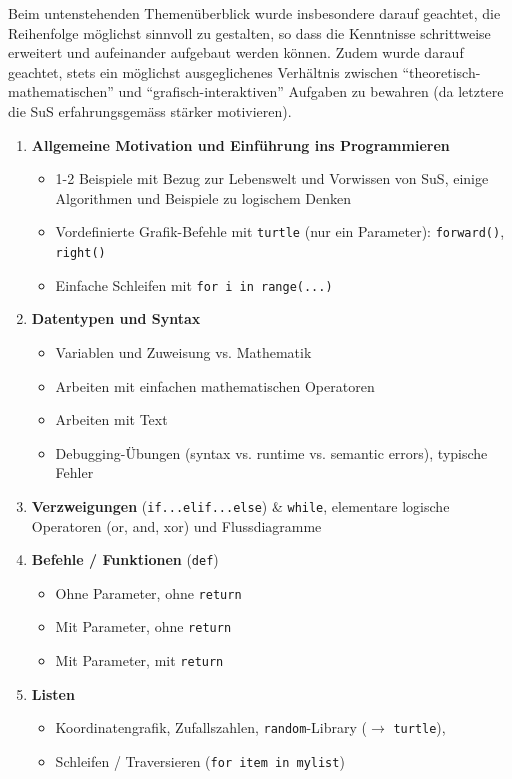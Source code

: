 Beim untenstehenden Themenüberblick wurde insbesondere darauf geachtet, die Reihenfolge möglichst sinnvoll zu gestalten, so dass die Kenntnisse schrittweise erweitert und aufeinander aufgebaut werden können. Zudem wurde darauf geachtet, stets ein möglichst ausgeglichenes Verhältnis zwischen \enquote{theoretisch-mathematischen} und \enquote{grafisch-interaktiven} Aufgaben zu bewahren (da letztere die SuS erfahrungsgemäss stärker motivieren).

\begin{overviewBox}[title=Überblick der Themen]
    \begin{enumerate}
    \item \textbf{Allgemeine Motivation und Einführung ins Programmieren}
    \begin{itemize}
        \item 1-2 Beispiele mit Bezug zur Lebenswelt und Vorwissen von SuS, einige Algorithmen und Beispiele zu logischem Denken
        \item Vordefinierte Grafik-Befehle mit \lstinline|turtle| (nur ein Parameter): \lstinline|forward()|, \lstinline|right()|
        \item Einfache Schleifen mit \lstinline|for i in range(...)|
    \end{itemize}
    \item \textbf{Datentypen und Syntax}
    \begin{itemize}
        \item Variablen und Zuweisung vs. Mathematik
        \item Arbeiten mit einfachen mathematischen Operatoren
        \item Arbeiten mit Text
        \item Debugging-Übungen (syntax vs. runtime vs. semantic errors), typische Fehler
    \end{itemize}
    \item \textbf{Verzweigungen} (\lstinline|if...elif...else|) \& \lstinline|while|,  elementare logische Operatoren (or, and, xor)  und Flussdiagramme
    \item \textbf{Befehle / Funktionen} (\lstinline|def|)
    \begin{itemize}
        \item Ohne Parameter, ohne \lstinline|return|
        \item Mit Parameter, ohne \lstinline|return|
        \item Mit Parameter, mit \lstinline|return|
    \end{itemize}
    \item \textbf{Listen}
    \begin{itemize}
        \item  Koordinatengrafik, Zufallszahlen, \lstinline|random|-Library ($\rightarrow$ \lstinline|turtle|), \item Schleifen / Traversieren (\lstinline|for item in mylist|)
    \end{itemize}
\end{enumerate}
\end{overviewBox}


